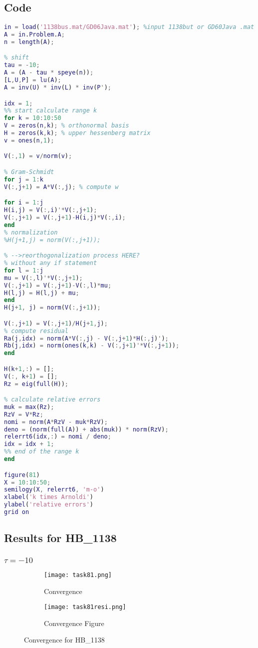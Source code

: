 \documentclass{article}
\begin{document}
\subsection{Code}
\begin{lstlisting}[language=Matlab, caption=task8.m]
in = load('1138bus.mat/GD06Java.mat'); %input 1138but or GD60Java .mat file
A = in.Problem.A;
n = length(A);

% shift
tau = -10;
A = (A - tau * speye(n));
[L,U,P] = lu(A);
A = inv(U) * inv(L) * inv(P');

idx = 1;
%% start calculate range k
for k = 10:10:50
V = zeros(n,k); % orthonormal basis
H = zeros(k,k); % upper hessenberg matrix
v = ones(n,1);

V(:,1) = v/norm(v);

% Gram-Schmidt
for j = 1:k
V(:,j+1) = A*V(:,j); % compute w

for i = 1:j
H(i,j) = V(:,i)'*V(:,j+1);
V(:,j+1) = V(:,j+1)-H(i,j)*V(:,i);
end
% normalization
%H(j+1,j) = norm(V(:,j+1));

% -->reorthogonalization process HERE?
% without any if statement
for l = 1:j
mu = V(:,l)'*V(:,j+1);
V(:,j+1) = V(:,j+1)-V(:,l)*mu;
H(l,j) = H(l,j) + mu;
end
H(j+1, j) = norm(V(:,j+1));

V(:,j+1) = V(:,j+1)/H(j+1,j);
% compute residual
Ra(j,idx) = norm(A*V(:,j) - V(:,j+1)*H(:,j)');
Rb(j,idx) = norm(ones(k,k) - V(:,j+1)'*V(:,j+1));
end

H(k+1,:) = [];
V(:, k+1) = [];
Rz = eig(full(H));

% calculate relative errors
muk = max(Rz);
RzV = V*Rz;
nomi = norm(A*RzV - muk*RzV);
deno = (norm(full(A)) + abs(muk)) * norm(RzV);
relerrt6(idx,:) = nomi / deno;
idx = idx + 1;
%% end of the range k
end

figure(81)
X = 10:10:50;
semilogy(X, relerrt6, 'm-o')
xlabel('k times Arnoldi')
ylabel('relative errors')
grid on
\end{lstlisting}
\subsection{Results for HB\_1138}
\subsubsection{$\tau=-10$}
\begin{figure}[H]
    \centering
    \begin{subfigure}{0.4\textwidth}
        \centering
        \texttt{[image: task81.png]}
        \caption{Convergence}
        \label{fig:task81}
    \end{subfigure}
    \begin{subfigure}{0.6\textwidth}
        \centering
        \texttt{[image: task81resi.png]}
        \caption{Convergence Figure}
        \label{fig:task81res}
    \end{subfigure}
    \caption{Convergence for HB\_1138}
    \label{fig:task81}
\end{figure}
\end{document}
